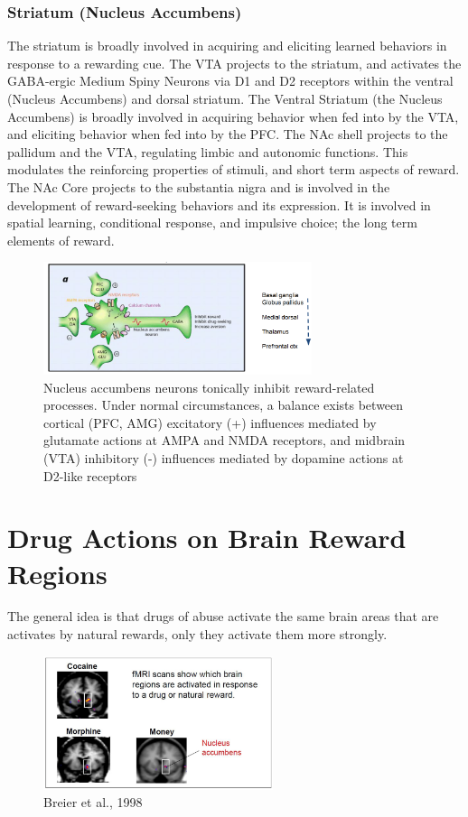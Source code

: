 \documentclass{book}
\begin{document}
\subsubsection{Striatum (Nucleus Accumbens)}
The striatum is broadly involved in acquiring and eliciting learned behaviors in response to a rewarding cue. 
The VTA projects to the striatum, and activates the GABA-ergic Medium Spiny Neurons via D1 and D2 receptors within the ventral (Nucleus Accumbens) and dorsal striatum.
The Ventral Striatum (the Nucleus Accumbens) is broadly involved in acquiring behavior when fed into by the VTA, and eliciting behavior when fed into by the PFC. 
The NAc shell projects to the pallidum and the VTA, regulating limbic and autonomic functions.
This modulates the reinforcing properties of stimuli, and short term aspects of reward. The NAc Core projects to the substantia nigra and is involved in the development of reward-seeking behaviors and its expression. It is involved in spatial learning, conditional response, and impulsive choice; the long term elements of reward.
\begin{figure}
    \centering
    \includegraphics[width=0.7\textwidth]{images3/image8.png}
    \caption{\label{fig:NAc}Nucleus accumbens neurons tonically inhibit reward-related processes. Under normal circumstances, a balance exists between cortical (PFC, AMG) excitatory (+) influences mediated by glutamate actions at AMPA and NMDA receptors, and midbrain (VTA) inhibitory (-) influences mediated by dopamine actions at D2-like receptors}
\end{figure}

\section{Drug Actions on Brain Reward Regions}
The general idea is that drugs of abuse activate the same brain areas that are activates by natural rewards, only they activate them more strongly.

\begin{figure}
    \centering
    \includegraphics[width=0.6\textwidth]{images3/image10.png}
    \caption{Breier et al., 1998}
\end{figure}
\end{document}
